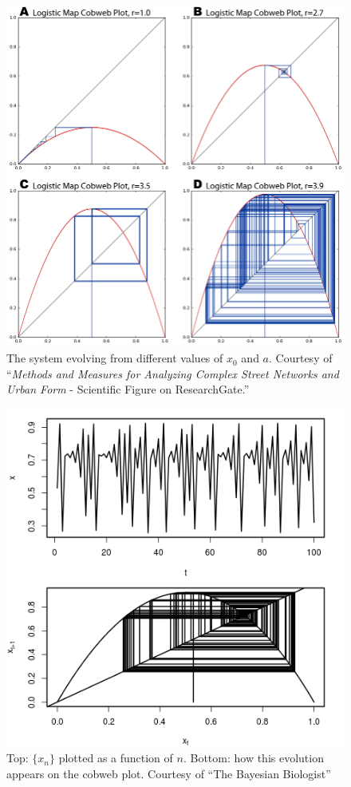 \documentclass[twocolumn,amsmath,amssymb,aps]{revtex4}
\begin{document}
\begin{figure}[!htb]
	\centering
	\includegraphics[scale=0.25]{cobweb}
	\caption{The system evolving from different values of $x_0$ and $a$. Courtesy of ``\textit{Methods and Measures for Analyzing Complex Street Networks and Urban Form} - Scientific Figure on ResearchGate.''}
	\label{fig:cobweb}
\end{figure}

\begin{figure}[!htb]
	\centering
	\includegraphics[scale=0.5]{cobweb_1}
	\caption{Top: $\{x_n\}$ plotted as a function of $n$. Bottom: how this evolution appears on the cobweb plot. Courtesy of ``The Bayesian Biologist''}
	\label{fig:cobweb1}
\end{figure}
\end{document}
